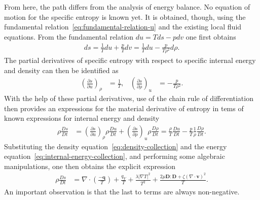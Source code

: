 From here, the path differs from the analysis of energy balance. No equation of motion for the specific entropy is known yet. It is obtained, though, using the fundamental relation~\eqref{eq:fundamental-relation-u} and the existing local fluid equations. From the fundamental relation $du=Tds-pdv$ one first obtains
\begin{align}
    ds=\frac{1}{T}du+\frac{p}{T}dv=\frac{1}{T}du-\frac{p}{T\rho^2}d\rho.
\end{align}
The partial derivatives of specific entropy with respect to specific internal energy and density can then be identified as
\begin{align}
    \left(\frac{\partial s}{\partial u}\right)_\rho&=\frac{1}{T}, & \left(\frac{\partial s}{\partial \rho}\right)_u&=-\frac{p}{T\rho^2}.
\end{align}
With the help of these partial derivatives, use of the chain rule of differentiation then provides an expressions for the material derivative of entropy in tems of known expressions for internal energy and density
\begin{align}
    \rho\frac{Ds}{Dt}&=\left(\frac{\partial s}{\partial u}\right)_\rho \rho\frac{Du}{Dt}+\left(\frac{\partial s}{\partial \rho}\right)_u \rho\frac{D\rho}{Dt}=\frac{\rho}{T}\frac{Du}{Dt}-\frac{p}{T}\frac{1}{\rho}\frac{D\rho}{Dt}.
\end{align}
Substituting the density equation~\eqref{eq:density-collection} and the energy equation~\eqref{eq:internal-energy-collection}, and performing some algebraic manipulations, one then obtains the explicit expression
\begin{align}
    \rho\frac{Ds}{Dt}&=\nabla\cdot\left(\frac{-\bm{q}}{T}\right)+\frac{q_V}{T}+\frac{\lambda|\nabla T|^2}{T^2}+\frac{2\mu\bm{D}:\bm{D}+\zeta(\nabla\cdot\bm{v})^2}{T}.
\end{align}
An important observation is that the last to terms are always non-negative.

